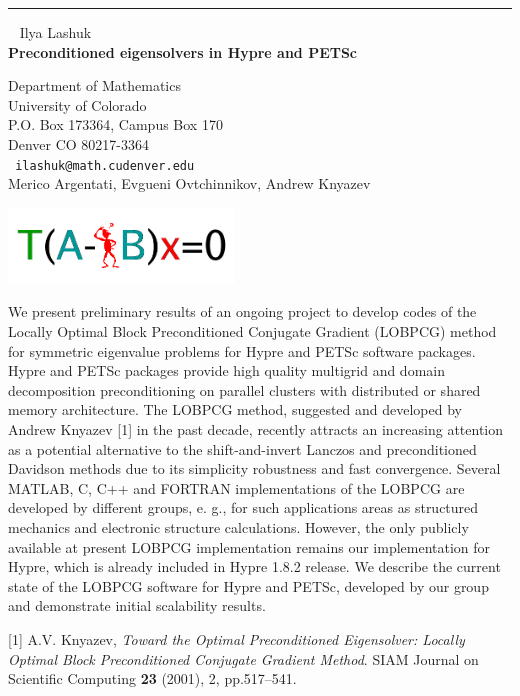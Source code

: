 \documentclass{report}
\begin{document}
\begin{center}

\rule{6in}{1pt} \
{\large
Ilya Lashuk
\\ {\bf
Preconditioned eigensolvers in Hypre and PETSc
}}

Department of Mathematics \\
University of Colorado \\
P.O. Box 173364, Campus Box 170 \\
Denver CO 80217-3364 
\\ {\tt
ilashuk@math.cudenver.edu
}
\\
Merico Argentati,
Evgueni Ovtchinnikov,
Andrew Knyazev

\includegraphics[width=60mm]{lashuk}
\end{center}

We present preliminary results of an ongoing project to develop codes
of the Locally Optimal Block Preconditioned Conjugate Gradient (LOBPCG)
method for symmetric eigenvalue problems for Hypre and PETSc software
packages. Hypre and PETSc packages provide high quality multigrid and
domain decomposition preconditioning on parallel clusters with
distributed or shared memory architecture. The LOBPCG method, suggested
and developed by Andrew Knyazev [1] in the past decade, recently
attracts an increasing attention as a potential alternative to the
shift-and-invert Lanczos and preconditioned Davidson methods due to its
simplicity robustness and fast convergence. Several MATLAB, C, C++ and
FORTRAN implementations of the LOBPCG are developed by different
groups, e. g., for such applications areas as structured mechanics and
electronic structure calculations. However, the only publicly available
at present LOBPCG implementation remains our implementation for Hypre,
which is already included in Hypre 1.8.2 release. We describe the
current state of the LOBPCG software for Hypre and PETSc, developed by
our group and demonstrate initial scalability results.

[1] A.V. Knyazev, {\em Toward the Optimal Preconditioned Eigensolver:
Locally Optimal Block Preconditioned Conjugate Gradient Method}.
SIAM Journal on Scientific Computing {\bf 23} (2001), 2, pp.517--541.
\end{document}
